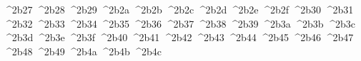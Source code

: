 {  ^^^^2b27%
  ^^^^2b28%
  ^^^^2b29%
  ^^^^2b2a%
  ^^^^2b2b%
  ^^^^2b2c%
  ^^^^2b2d%
  ^^^^2b2e%
  ^^^^2b2f%
  ^^^^2b30%
  ^^^^2b31%
  ^^^^2b32%
  ^^^^2b33%
  ^^^^2b34%
  ^^^^2b35%
  ^^^^2b36%
  ^^^^2b37%
  ^^^^2b38%
  ^^^^2b39%
  ^^^^2b3a%
  ^^^^2b3b%
  ^^^^2b3c%
  ^^^^2b3d%
  ^^^^2b3e%
  ^^^^2b3f%
  ^^^^2b40%
  ^^^^2b41%
  ^^^^2b42%
  ^^^^2b43%
  ^^^^2b44%
  ^^^^2b45%
  ^^^^2b46%
  ^^^^2b47%
  ^^^^2b48%
  ^^^^2b49%
  ^^^^2b4a%
  ^^^^2b4b%
  ^^^^2b4c%
}
